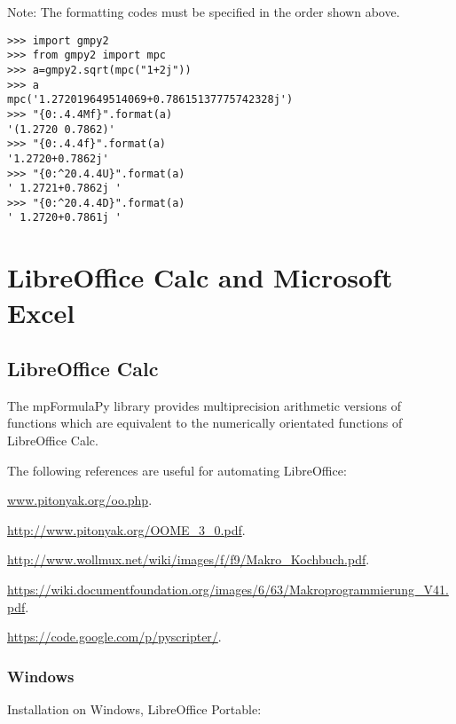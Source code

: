 Note: The formatting codes must be specified in the order shown above.

\begin{lstlisting}
>>> import gmpy2
>>> from gmpy2 import mpc
>>> a=gmpy2.sqrt(mpc("1+2j"))
>>> a
mpc('1.272019649514069+0.78615137775742328j')
>>> "{0:.4.4Mf}".format(a)
'(1.2720 0.7862)'
>>> "{0:.4.4f}".format(a)
'1.2720+0.7862j'
>>> "{0:^20.4.4U}".format(a)
' 1.2721+0.7862j '
>>> "{0:^20.4.4D}".format(a)
' 1.2720+0.7861j '
\end{lstlisting}





\chapter{LibreOffice Calc and Microsoft Excel}
\label{Spreadsheets} 


\section{LibreOffice Calc}
The mpFormulaPy library provides multiprecision arithmetic versions of  functions which are equivalent to the numerically orientated functions of LibreOffice Calc.

The following references are useful for automating LibreOffice:

\vpara
\href{www.pitonyak.org/oo.php}{www.pitonyak.org/oo.php}. 

\vpara
\href{http://www.pitonyak.org/OOME\_3\_0.pdf}{http://www.pitonyak.org/OOME\_3\_0.pdf}. 

\vpara
\href{http://www.wollmux.net/wiki/images/f/f9/Makro\_Kochbuch.pdf}{http://www.wollmux.net/wiki/images/f/f9/Makro\_Kochbuch.pdf}. 

\vpara
\href{https://wiki.documentfoundation.org/images/6/63/Makroprogrammierung\_V41.pdf}{https://wiki.documentfoundation.org/images/6/63/Makroprogrammierung\_V41.pdf}. 


\vpara
\href{https://code.google.com/p/pyscripter/}{https://code.google.com/p/pyscripter/}. 










\subsection{Windows}
Installation on Windows, LibreOffice Portable:

